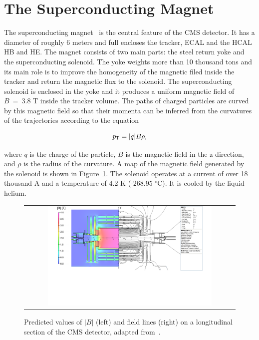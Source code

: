 \section{The Superconducting Magnet}
\label{sec:Magnet}

The superconducting magnet~\cite{CMS:1997moj} is the central feature of the \ac{CMS} detector. It has a diameter of roughly 6 meters and full encloses the tracker, \ac{ECAL} and the \ac{HCAL} HB and HE. The magnet consists of two main parts: the steel return yoke and the superconducting solenoid. The yoke weights more than 10 thousand tons and its main role is to improve the homogeneity of the magnetic filed inside the tracker and return the magnetic flux to the solenoid. The superconducting solenoid is enclosed in the yoke and it produces a uniform magnetic field of $B~=~3.8$ T inside the tracker volume. The paths of charged particles are curved by this magnetic field so that their momenta can be inferred from the curvatures of the trajectories according to the equation

\begin{equation}
p_{\textsf{T}} = |q|B\rho,
\end{equation}

where $q$ is the charge of the particle, $B$ is the magnetic field in the z direction, and $\rho$ is the radius of the curvature. A map of  the magnetic field generated by the solenoid is shown in Figure~\ref{fig:Magnet}. The solenoid operates at a current of over 18 thousand A and a temperature of 4.2 K (-268.95 $^\circ$C). It is cooled by the liquid helium.

\begin{figure}[tbh!]
 \begin{center}
 \begin{tabular}{c}
 \includegraphics[width=0.8\textwidth]{figures/Part2/CMS/Magnet}
 \end{tabular}
 \caption{Predicted values of $|B|$ (left) and field lines (right) on a longitudinal section of the \ac{CMS} detector, adapted from~\cite{CMS:2009moq}.}
 \label{fig:Magnet}
 \end{center}
\end{figure}

